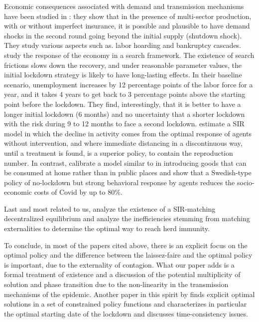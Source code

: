 \documentclass{amsart}
\begin{document}
Economic consequences associated with demand and transmission mechanisms have been studied in \cite{guerrieri2020macroeconomic}: they show that in the presence of multi-sector production, with or without imperfect insurance, it is possible and plausible to have demand shocks in the second round going beyond the initial supply (shutdown shock). They study various aspects such as. labor hoarding and bankruptcy cascades. \cite{gregory2020pandemic} study the response of the economy in a search framework. The existence of search frictions slows down the recovery, and under reasonable parameter values, the initial lockdown strategy is likely to have long-lasting effects. In their baseline scenario, unemployment increases by 12 percentage points of the labor force for a year, and it takes 4 years to get back to 3 percentage points above the starting point before the lockdown. They find, interestingly, that it is better to have a longer initial lockdown (6 months) and no uncertainty that a shorter lockdown with the risk during 9 to 12 months to face a second lockdown. \cite{farboodi2020internal} estimate a SIR model in which the decline in activity comes from the optimal response of agents without intervention, and where immediate distancing in a discontinuous way, until a treatment is found, is a superior policy, to contain the reproduction number. In contrast, \cite{krueger2020taojun} calibrate a model similar to \cite{eichenbaum2020macroeconomics} in introducing goods that can be consumed at home rather than in public places and show that a Swedish-type policy of no-lockdown but strong behavioral response by agents reduces the socio-economic costs of Covid by up to 80\%.  

Last and most related to us, \cite{garibaldi2020modelling} analyze the existence of a SIR-matching decentralized equilibrium and analyze the inefficiencies stemming from matching externalities to determine the optimal way to reach herd immunity.

To conclude, in most of the papers cited above, there is an explicit focus on the optimal policy and the difference between the laissez-faire and the optimal policy is important, due to the externality of contagion. What our paper adds is a formal treatment of existence and a discussion of the potential multiplicity of solution and phase transition due to the non-linearity in the transmission mechanisms of the epidemic. Another paper in this spirit by \cite{lukaszrachel} finds explicit optimal solutions in a set of constrained policy functions and characterizes in particular the optimal starting date of the lockdown and discusses time-consistency issues.
\end{document}
